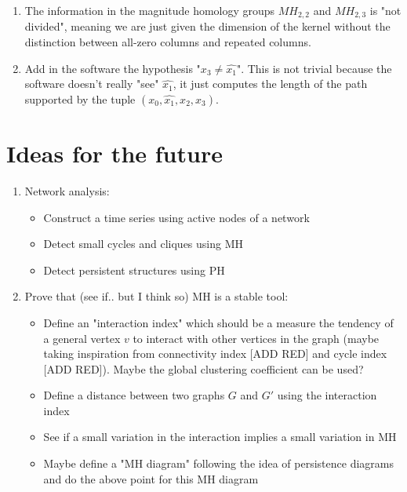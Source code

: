 \documentclass{article}
\begin{document}
	\begin{enumerate}
		\item The information in the magnitude homology groups $MH_{2,2}$ and $MH_{2,3}$ is "not divided", meaning we are just given the dimension of the kernel without the distinction between all-zero columns and repeated columns.
		\item Add in the software the hypothesis "$x_3 \neq \hat{x_1}$". This is not trivial because the software doesn't really "see" $\hat{x_1}$, it just computes the length of the path supported by the tuple $(x_0,\hat{x_1},x_2,x_3)$.
	\end{enumerate}

\section{Ideas for the future}

\begin{enumerate}
	\item Network analysis:
	\begin{itemize}
		\item Construct a time series using active nodes of a network
		\item Detect small cycles and cliques using MH
		\item Detect persistent structures using PH
	\end{itemize}

	\item Prove that (see if.. but I think so) MH is a stable tool:
	\begin{itemize}
		\item Define an "interaction index" which should be a measure the tendency of a general vertex $v$ to interact with other vertices in the graph (maybe taking inspiration from connectivity index [ADD RED] and cycle index [ADD RED]). Maybe the global clustering coefficient can be used?
		\item Define a distance between two graphs $G$ and $G'$ using the interaction index
		\item See if a small variation in the interaction implies a small variation in MH
		\item Maybe define a "MH diagram" following the idea of persistence diagrams and do the above point for this MH diagram  
	\end{itemize}
	
\end{enumerate}

	


\end{document}
